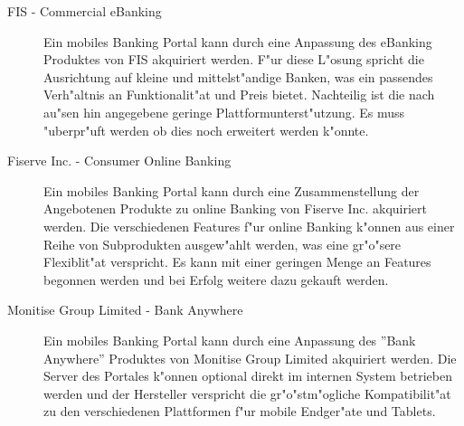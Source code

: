 \begin{description}

	\item[FIS - Commercial eBanking]  Ein mobiles Banking Portal kann durch eine Anpassung des eBanking Produktes von FIS akquiriert werden. F"ur diese L"osung spricht die Ausrichtung auf kleine und mittelst"andige Banken, was ein passendes Verh"altnis an Funktionalit"at und Preis bietet. Nachteilig ist die nach au"sen hin angegebene geringe Plattformunterst"utzung. Es muss "uberpr"uft werden ob dies noch erweitert werden k"onnte.
	
	\item[Fiserve Inc. - Consumer Online Banking] Ein mobiles Banking Portal kann durch eine Zusammenstellung der Angebotenen Produkte zu online Banking von Fiserve Inc. akquiriert werden. Die verschiedenen Features f"ur online Banking k"onnen aus einer Reihe von Subprodukten ausgew"ahlt werden, was eine gr"o"sere Flexiblit"at verspricht. Es kann mit einer geringen Menge an Features begonnen werden und bei Erfolg weitere dazu gekauft werden.
	
	\item[Monitise Group Limited - Bank Anywhere] Ein mobiles Banking Portal kann durch eine Anpassung des ''Bank Anywhere'' Produktes von Monitise Group Limited akquiriert werden. Die Server des Portales k"onnen optional direkt im internen System betrieben werden und der Hersteller verspricht die gr"o"stm"ogliche Kompatibilit"at zu den verschiedenen Plattformen f"ur mobile Endger"ate und Tablets.
	
\end{description}